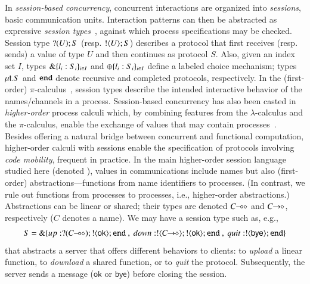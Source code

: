 In \emph{session-based concurrency}, concurrent interactions are organized into \emph{sessions}, basic communication units.
Interaction patterns can then be abstracted as expressive \emph{session types}~\cite{honda.vasconcelos.kubo:language-primitives}, against which process specifications may be checked. 
Session type $? (U) ; S$ (resp.  $! \langle U \rangle ; S$)
describes a protocol that first receives (resp. sends) a value of type $U$ and then continues as protocol $S$.
Also, given an index set $I$, types $\& \{l_i:S_i\}_{i \in I}$ 
and $\oplus \{l_i:S_i\}_{i \in I}$ 
define %
 a labeled choice mechanism; types 
$\mu\mathsf{t}.S$ 
and 
$\mathtt{end}$ denote recursive and completed protocols, respectively.
In the (first-order) $\pi$-calculus~\cite{MilnerR:calmp1}, 
session types describe the intended interactive behavior of the names/channels in a process.
Session-based concurrency has also been casted in \emph{higher-order} process
calculi which, by combining features from the $\lambda$-calculus and the $\pi$-calculus, 
enable the exchange of values that may contain processes~\cite{tlca07,DBLP:journals/jfp/GayV10}. 
Besides offering a natural bridge between concurrent and functional computation, 
higher-order calculi with sessions enable the specification of protocols involving \emph{code mobility}, 
frequent in practice.
In the main higher-order session language  studied here (denoted \HOp),
 values in communications include names but also (first-order) abstractions---functions from name identifiers to processes. 
 (In contrast, we rule out functions from processes to processes, i.e., higher-order abstractions.)
Abstractions can be linear or shared; their types are  denoted $C\!\! \multimap\!\! \diamond$ and $C\!\! \rightarrow\!\! \diamond$, respectively ($C$ 
denotes a name). We may have a 
session type such as, e.g.,
$$S = \btbra{up:\btinp{\lhot{C}}\btout{\mathsf{ok}}\tinact ~ , ~ down:\btout{\shot{C}}\btout{\mathsf{ok}}\tinact ~ , ~quit:\btout{\mathsf{bye}}\tinact}_{}$$
that abstracts a server that offers different behaviors to clients: 
  to \emph{upload} a linear function, %
  to \emph{download} a shared function, %
   or to \emph{quit} the protocol. Subsequently, 
  the server sends a message ($\mathsf{ok}$ or $\mathsf{bye}$) before closing the session.



